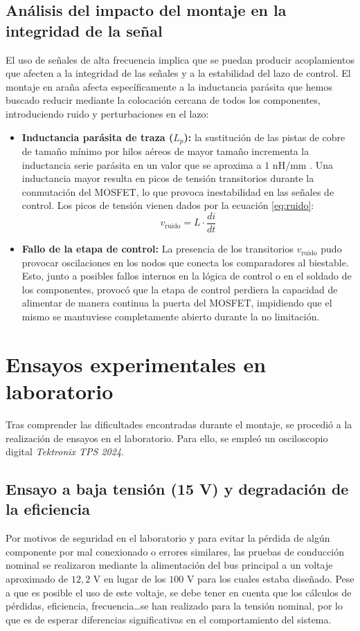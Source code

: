 \documentclass[12pt]{report} %
\begin{document}
\subsection{Análisis del impacto del montaje en la integridad de la señal}
\label{subsec:analisis_emi_dead_bug}
El uso de señales de alta frecuencia implica que se puedan producir acoplamientos que afecten a la integridad de las señales y a la estabilidad del lazo de control. El montaje en araña afecta específicamente a la inductancia parásita que hemos buscado reducir mediante la colocación cercana de todos los componentes, introduciendo ruido y perturbaciones en el lazo:
\begin{itemize}
    \item \textbf{Inductancia parásita de traza ($L_p$):} la sustitución de las pistas de cobre de tamaño mínimo por hilos aéreos de mayor tamaño incrementa la inductancia serie parásita en un valor que se aproxima a $1\text{ nH/mm}$ \cite{sierra_circuits_high-speed_nodate}. Una inductancia mayor resulta en picos de tensión transitorios durante la conmutación del MOSFET, lo que provoca inestabilidad en las señales de control. Los picos de tensión vienen dados por la ecuación \ref{eq:ruido}: 
    \begin{equation}
        \label{eq:ruido}
        v_{\text{ruido}} = L \cdot \frac{di}{dt}
    \end{equation}
    \item \textbf{Fallo de la etapa de control:} La presencia de los transitorios $v_{\text{ruido}}$ pudo provocar oscilaciones en los nodos que conecta los comparadores al biestable. Esto, junto a posibles fallos internos en la lógica de control o en el soldado de los componentes, provocó que la etapa de control perdiera la capacidad de alimentar de manera continua la puerta del MOSFET, impidiendo que el mismo se mantuviese completamente abierto durante la no limitación. 
\end{itemize}

\section{Ensayos experimentales en laboratorio}
\label{sec:ensayos_laboratorio}
Tras comprender las dificultades encontradas durante el montaje, se procedió a la realización de ensayos en el laboratorio. Para ello, se empleó un osciloscopio digital \textit{Tektronix TPS 2024}.
\subsection{Ensayo a baja tensión (15 V) y degradación de la eficiencia}
\label{subsec:baja_tension_eficiencia}
Por motivos de seguridad en el laboratorio y para evitar la pérdida de algún componente por mal conexionado o errores similares, las pruebas de conducción nominal se realizaron mediante la alimentación del bus principal a un voltaje aproximado de $12{,}2\text{ V}$ en lugar de los $100\text{ V}$ para los cuales estaba diseñado. Pese a que es posible el uso de este voltaje, se debe tener en cuenta que los cálculos de pérdidas, eficiencia, frecuencia\dots se han realizado para la tensión nominal, por lo que es de esperar diferencias significativas en el comportamiento del sistema.
\end{document}
